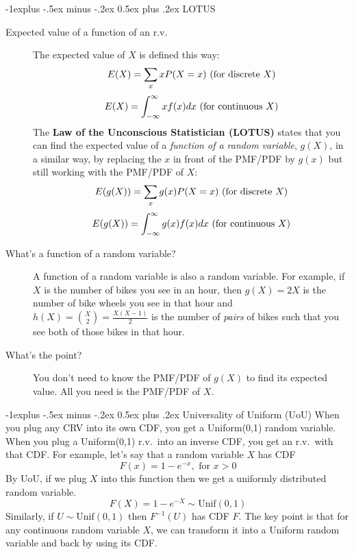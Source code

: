 \documentclass[10pt,landscape]{article}
\makeatletter
\renewcommand{\subsection}{\@startsection{subsection}{2}{0mm}%
{-1explus -.5ex minus -.2ex}%
{0.5ex plus .2ex}%
{\normalfont\normalsize\bfseries}}
\makeatother
\begin{document}
\begin{multicols*}{3}
        \label{lotus}

        \subsection{LOTUS}
        \begin{description}
            \item[Expected value of a function of an r.v.]
            The expected value of $X$ is defined this way:
            \[E(X) = \sum_x xP(X=x) \textnormal{ (for discrete $X$)}\]
            \[E(X) = \int^\infty_{-\infty}xf(x)dx  \textnormal{ (for continuous $X$)}\]
            The \textbf{Law of the Unconscious Statistician (LOTUS)} states that you can find the expected value of a \emph{function of a random variable}, $g(X)$, in a similar way, by replacing the $x$ in front of the PMF/PDF by $g(x)$ but still working with the PMF/PDF of $X$:
            \[E(g(X)) = \sum_x g(x)P(X=x) \textnormal{ (for discrete $X$)}\]
            \[E(g(X)) = \int^\infty_{-\infty}g(x)f(x)dx \textnormal{ (for continuous $X$)}\]
            \item[What's a function of a random variable?] A function of a random variable is also a random variable. For example, if $X$ is the number of bikes you see in an hour, then $g(X) =  2X$ is the number of bike wheels you see in that hour and $h(X) = {X \choose 2} = \frac{X(X-1)}{2}$ is the number of \emph{pairs} of bikes such that you see both of those bikes in that hour.
            \item[What's the point?] You don't need to know the PMF/PDF of $g(X)$ to find its expected value. All you need is the PMF/PDF of $X$.
        \end{description}

        \subsection{Universality of Uniform (UoU)}
        When you plug any CRV into its own CDF, you get a Uniform(0,1) random variable. When you plug a Uniform(0,1) r.v.~into an inverse CDF, you get an r.v.~with that CDF. For example, let's say that a random variable $X$ has CDF
        \[ F(x) = 1 - e^{-x}, \textrm{ for $x>0$} \]
        By UoU, if we plug $X$ into this function then we get a uniformly distributed random variable.
        \[ F(X) = 1 - e^{-X} \sim \textrm{Unif}(0,1)\]
        Similarly, if $U \sim \textrm{Unif}(0,1)$ then $F^{-1}(U)$ has CDF $F$. The key point is that {for any continuous random variable $X$, we can transform it into a Uniform random variable and back by using its CDF.}



\end{multicols*}
\end{document}
